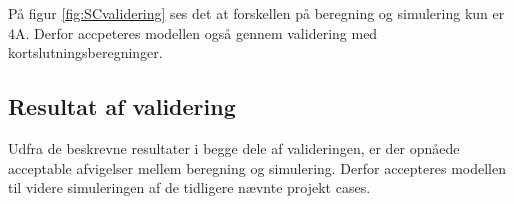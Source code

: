 På figur \ref{fig:SCvalidering} ses det at forskellen på beregning og simulering kun er 4A. Derfor accpeteres modellen også gennem validering med kortslutningsberegninger.



\subsection{Resultat af validering}

Udfra de beskrevne resultater i begge dele af valideringen, er der opnåede acceptable afvigelser mellem beregning og simulering. Derfor accepteres modellen til videre simuleringen af de tidligere nævnte projekt cases.